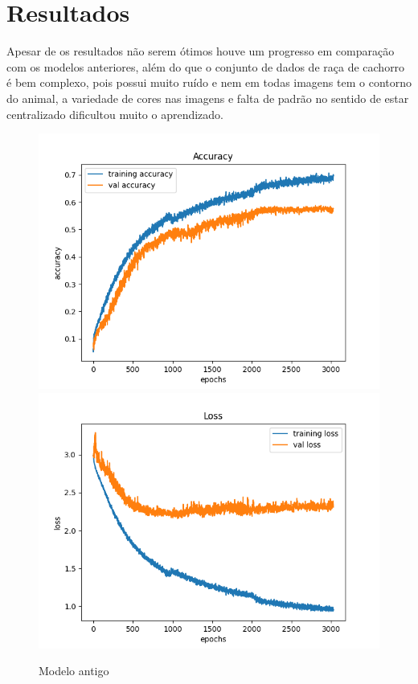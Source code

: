\documentclass{article}
\begin{document}
\newpage

\section{Resultados}

Apesar de os resultados não serem ótimos houve um progresso em comparação com os modelos anteriores, além do que o conjunto de dados de raça de cachorro é bem complexo, pois possui muito ruído e nem em todas imagens tem o contorno do animal, a variedade de cores nas imagens e falta de padrão no sentido de estar centralizado dificultou muito o aprendizado.

\begin{figure}[h]
    \centering
    \includegraphics[scale=0.45]{longo_epochs_accuracy_old}
    \includegraphics[scale=0.45]{longo_epochs_loss_old}
    \caption{Modelo antigo}
\end{figure}
\end{document}
